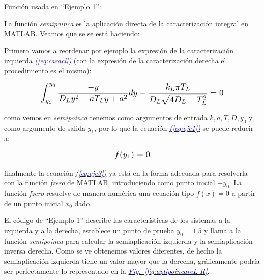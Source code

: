 \documentclass[12pt,a4paper]{report} %
\newcommand{\fref}[1]{\hyperref[#1]{\textcolor{blue}{\textit{Fig.~\ref*{#1}}}}}
\newcommand{\eref}[1]{\hyperref[#1]{\textcolor{blue}{\textit{(\ref*{#1})}}}}
\begin{document}
	\vspace{1cm}
	
	\vspace{1cm}
	
	\vspace{1cm}\noindent Función usada en ``Ejemplo 1'':
	\vspace{0.5cm}
	
	\newpage
	
	La función \textit{semipoinca} es la aplicación directa de la caracterización integral en MATLAB. Veamos que se se está haciendo:
	
	\vspace{0.5cm}\noindent Primero vamos a reordenar por ejemplo la expresión de la caracterización izquierda \eref{eq:caracl} (con la expresión de la caracterización derecha el procedimiento es el mismo):
	
	\begin{equation}
			\label{eq:eje1}
		\scalebox{1.2}{$\displaystyle
		\begin{gathered}
			\int_{y_1}^{y_0}\frac{-y}{D_Ly^2-aT_Ly+a^2}dy-\frac{k_L\pi T_L}{D_L\sqrt{4D_L-T_L^2}}=0
		\end{gathered}
			$}
	\end{equation}\smallskip
	
	\noindent como vemos en \textit{semipoinca} tenemos como argumentos de entrada $k,a,T,D,y_0$ y como argumento de salida $y_1$, por lo que la ecuación \eref{eq:eje1} se puede reducir a:
	
		\begin{equation}
		\label{eq:eje3}
		\scalebox{1.2}{$\displaystyle
				f(y_1)=0
			$}
	\end{equation}\smallskip
	
	\noindent finalmente la ecuación \eref{eq:eje3} ya está en la forma adecuada para resolverla con la función \textit{fzero} de MATLAB, introduciendo como punto inicial $-y_0$. La función \textit{fzero} resuelve de manera numérica una ecuación tipo $f(x)=0$ a partir de un punto inicial $x_0$ dado.
	
	\vspace{0.5cm}\noindent El código de ``Ejemplo 1'' describe las características de los sistemas a la izquierda y a la derecha, establece un punto de prueba $y_0=1.5$ y llama a la función \textit{semipoinca} para calcular la semiaplicación izquierda y la semiaplicación inversa derecha. Como se ve obtenemos valores diferentes, de hecho la semiaplicación izquierda tiene un valor mayor que la derecha, gráficamente podría ser perfectamente lo representado en la \fref{fig:aplipoincareL-R}.
	\newpage
	
\end{document}
